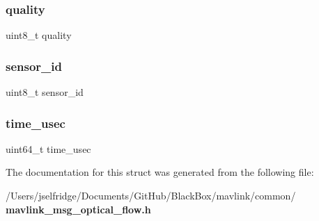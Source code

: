 \subsubsection{quality}
{\footnotesize\ttfamily uint8\+\_\+t quality}

\mbox{\label{struct____mavlink__optical__flow__t_a4235eb8d0a808af8011670dfe7a5671f}} 
\subsubsection{sensor\+\_\+id}
{\footnotesize\ttfamily uint8\+\_\+t sensor\+\_\+id}

\mbox{\label{struct____mavlink__optical__flow__t_a2db60704c293664dcb6159b55c98c2f2}} 
\subsubsection{time\+\_\+usec}
{\footnotesize\ttfamily uint64\+\_\+t time\+\_\+usec}



The documentation for this struct was generated from the following file\+:\begin{DoxyCompactItemize}
\item 
/\+Users/jselfridge/\+Documents/\+Git\+Hub/\+Black\+Box/mavlink/common/\textbf{ mavlink\+\_\+msg\+\_\+optical\+\_\+flow.\+h}\end{DoxyCompactItemize}
